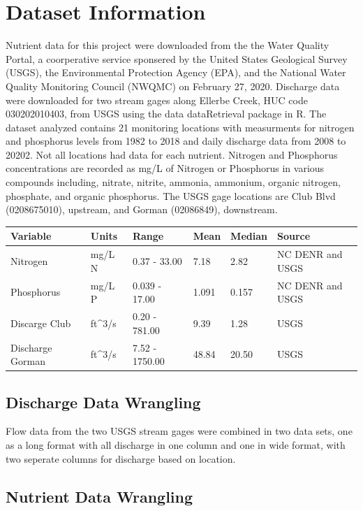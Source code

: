 \documentclass[12pt,]{article}
\begin{document}
\newpage

\hypertarget{dataset-information}{%
\section{Dataset Information}\label{dataset-information}}

Nutrient data for this project were downloaded from the the Water
Quality Portal, a coorperative service sponsered by the United States
Geological Survey (USGS), the Environmental Protection Agency (EPA), and
the National Water Quality Monitoring Council (NWQMC) on February 27,
2020. Discharge data were downloaded for two stream gages along Ellerbe
Creek, HUC code 030202010403, from USGS using the data dataRetrieval
package in R. The dataset analyzed contains 21 monitoring locations with
measurments for nitrogen and phosphorus levels from 1982 to 2018 and
daily discharge data from 2008 to 20202. Not all locations had data for
each nutrient. Nitrogen and Phosphorus concentrations are recorded as
mg/L of Nitrogen or Phosphorus in various compounds including, nitrate,
nitrite, ammonia, ammonium, organic nitrogen, phosphate, and organic
phosphorus. The USGS gage locations are Club Blvd (0208675010),
upstream, and Gorman (02086849), downstream.

\begin{longtable}[]{@{}llllll@{}}
\toprule
Variable & Units & Range & Mean & Median & Source\tabularnewline
\midrule
\endhead
Nitrogen & mg/L N & 0.37 - 33.00 & 7.18 & 2.82 & NC DENR and
USGS\tabularnewline
Phosphorus & mg/L P & 0.039 - 17.00 & 1.091 & 0.157 & NC DENR and
USGS\tabularnewline
Discarge Club & ft\^{}3/s & 0.20 - 781.00 & 9.39 & 1.28 &
USGS\tabularnewline
Discharge Gorman & ft\^{}3/s & 7.52 - 1750.00 & 48.84 & 20.50 &
USGS\tabularnewline
\bottomrule
\end{longtable}

\hypertarget{discharge-data-wrangling}{%
\subsection{Discharge Data Wrangling}\label{discharge-data-wrangling}}

Flow data from the two USGS stream gages were combined in two data sets,
one as a long format with all discharge in one column and one in wide
format, with two seperate columns for discharge based on location.

\hypertarget{nutrient-data-wrangling}{%
\subsection{Nutrient Data Wrangling}\label{nutrient-data-wrangling}}
\end{document}
